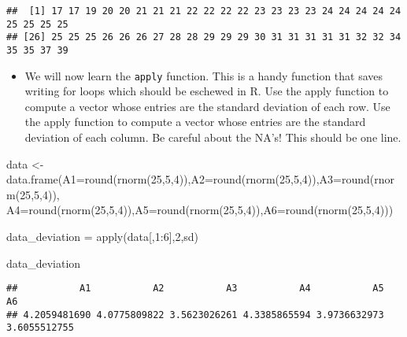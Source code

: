 \documentclass[
]{article}
\newenvironment{Shaded}{\begin{snugshade}}{\end{snugshade}}
\newcommand{\AttributeTok}[1]{\textcolor[rgb]{0.77,0.63,0.00}{#1}}
\newcommand{\DecValTok}[1]{\textcolor[rgb]{0.00,0.00,0.81}{#1}}
\newcommand{\FunctionTok}[1]{\textcolor[rgb]{0.00,0.00,0.00}{#1}}
\newcommand{\NormalTok}[1]{#1}
\newcommand{\OtherTok}[1]{\textcolor[rgb]{0.56,0.35,0.01}{#1}}
\newcommand{\SpecialCharTok}[1]{\textcolor[rgb]{0.00,0.00,0.00}{#1}}
\providecommand{\tightlist}{%
  \setlength{\itemsep}{0pt}\setlength{\parskip}{0pt}}
\begin{document}
\begin{verbatim}
##  [1] 17 17 19 20 20 21 21 21 22 22 22 22 23 23 23 23 24 24 24 24 24 25 25 25 25
## [26] 25 25 25 26 26 26 27 28 28 29 29 29 30 31 31 31 31 31 32 32 34 35 35 37 39
\end{verbatim}

\begin{itemize}
\tightlist
\item
  We will now learn the \texttt{apply} function. This is a handy
  function that saves writing for loops which should be eschewed in R.
  Use the apply function to compute a vector whose entries are the
  standard deviation of each row. Use the apply function to compute a
  vector whose entries are the standard deviation of each column. Be
  careful about the NA's! This should be one line.
\end{itemize}

\begin{Shaded}
\begin{Highlighting}[]
\NormalTok{data }\OtherTok{\textless{}{-}} \FunctionTok{data.frame}\NormalTok{(}\AttributeTok{A1=}\FunctionTok{round}\NormalTok{(}\FunctionTok{rnorm}\NormalTok{(}\DecValTok{25}\NormalTok{,}\DecValTok{5}\NormalTok{,}\DecValTok{4}\NormalTok{)),}\AttributeTok{A2=}\FunctionTok{round}\NormalTok{(}\FunctionTok{rnorm}\NormalTok{(}\DecValTok{25}\NormalTok{,}\DecValTok{5}\NormalTok{,}\DecValTok{4}\NormalTok{)),}\AttributeTok{A3=}\FunctionTok{round}\NormalTok{(}\FunctionTok{rnorm}\NormalTok{(}\DecValTok{25}\NormalTok{,}\DecValTok{5}\NormalTok{,}\DecValTok{4}\NormalTok{)),}
\AttributeTok{A4=}\FunctionTok{round}\NormalTok{(}\FunctionTok{rnorm}\NormalTok{(}\DecValTok{25}\NormalTok{,}\DecValTok{5}\NormalTok{,}\DecValTok{4}\NormalTok{)),}\AttributeTok{A5=}\FunctionTok{round}\NormalTok{(}\FunctionTok{rnorm}\NormalTok{(}\DecValTok{25}\NormalTok{,}\DecValTok{5}\NormalTok{,}\DecValTok{4}\NormalTok{)),}\AttributeTok{A6=}\FunctionTok{round}\NormalTok{(}\FunctionTok{rnorm}\NormalTok{(}\DecValTok{25}\NormalTok{,}\DecValTok{5}\NormalTok{,}\DecValTok{4}\NormalTok{)))}

\NormalTok{data\_deviation }\OtherTok{=} \FunctionTok{apply}\NormalTok{(data[,}\DecValTok{1}\SpecialCharTok{:}\DecValTok{6}\NormalTok{],}\DecValTok{2}\NormalTok{,sd)}

\NormalTok{data\_deviation}
\end{Highlighting}
\end{Shaded}

\begin{verbatim}
##           A1           A2           A3           A4           A5           A6 
## 4.2059481690 4.0775809822 3.5623026261 4.3385865594 3.9736632973 3.6055512755
\end{verbatim}
\end{document}
